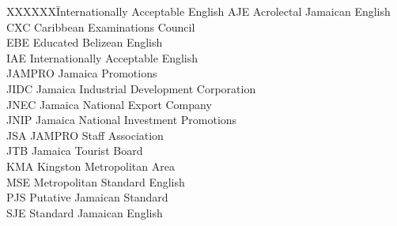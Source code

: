 
\begin{tabbing}
XXXXXX\hspace{1em}\=Internationally Acceptable English\kill
AJE \> Acrolectal Jamaican English       \\   
CXC \> Caribbean Examinations Council    \\
EBE \> Educated {Belizean} English         \\
{IAE} \> Internationally Acceptable English\\  
{JAMPRO} \> Jamaica Promotions\\
{JIDC} \> Jamaica Industrial Development Corporation\\
{JNEC} \> Jamaica National Export Company\\
{JNIP} \> Jamaica National Investment Promotions\\
{JSA} \> {JAMPRO} Staff Association          \\
{JTB} \> Jamaica Tourist Board\\
KMA \> {Kingston} Metropolitan Area        \\
{MSE} \> Metropolitan {Standard English}     \\
{PJS} \> Putative Jamaican Standard        \\
{SJE} \> Standard Jamaican English         \\
\end{tabbing}
